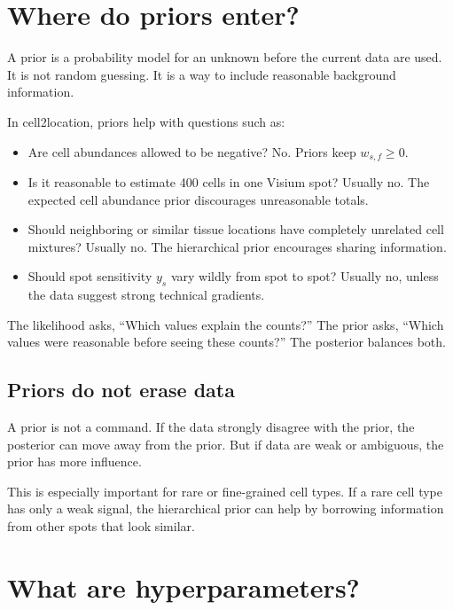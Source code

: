 \documentclass[11pt]{article}
\begin{document}
\section{Where do priors enter?}

A prior is a probability model for an unknown before the current data are used. It is not random guessing. It is a way to include reasonable background information.

In cell2location, priors help with questions such as:

\begin{itemize}
  \item Are cell abundances allowed to be negative? No. Priors keep $w_{s,f}\ge 0$.
  \item Is it reasonable to estimate 400 cells in one Visium spot? Usually no. The expected cell abundance prior discourages unreasonable totals.
  \item Should neighboring or similar tissue locations have completely unrelated cell mixtures? Usually no. The hierarchical prior encourages sharing information.
  \item Should spot sensitivity $y_s$ vary wildly from spot to spot? Usually no, unless the data suggest strong technical gradients.
\end{itemize}

\begin{bigidea}
The likelihood asks, ``Which values explain the counts?'' The prior asks, ``Which values were reasonable before seeing these counts?'' The posterior balances both.
\end{bigidea}

\subsection{Priors do not erase data}

A prior is not a command. If the data strongly disagree with the prior, the posterior can move away from the prior. But if data are weak or ambiguous, the prior has more influence.

This is especially important for rare or fine-grained cell types. If a rare cell type has only a weak signal, the hierarchical prior can help by borrowing information from other spots that look similar.

\section{What are hyperparameters?}
\end{document}
